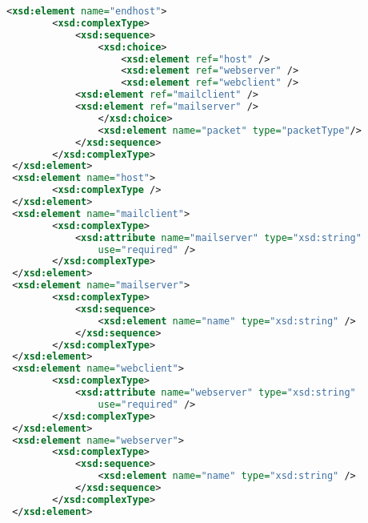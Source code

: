 \begin{lstlisting}[language=XML, caption=Proposal for a generalized endhost data representation]
<xsd:element name="endhost">
        <xsd:complexType>
        	<xsd:sequence>
                <xsd:choice>
	            	<xsd:element ref="host" />
	            	<xsd:element ref="webserver" />
	            	<xsd:element ref="webclient" />
			<xsd:element ref="mailclient" />
			<xsd:element ref="mailserver" />
	            </xsd:choice>
	            <xsd:element name="packet" type="packetType"/>
            </xsd:sequence>
        </xsd:complexType>
 </xsd:element>
 <xsd:element name="host">
        <xsd:complexType />
 </xsd:element>
 <xsd:element name="mailclient">
        <xsd:complexType>
            <xsd:attribute name="mailserver" type="xsd:string"
                use="required" />
        </xsd:complexType>
 </xsd:element>
 <xsd:element name="mailserver">
        <xsd:complexType>
            <xsd:sequence>
                <xsd:element name="name" type="xsd:string" />
            </xsd:sequence>
        </xsd:complexType>
 </xsd:element>
 <xsd:element name="webclient">
        <xsd:complexType>
            <xsd:attribute name="webserver" type="xsd:string"
                use="required" />
        </xsd:complexType>
 </xsd:element>
 <xsd:element name="webserver">
        <xsd:complexType>
            <xsd:sequence>
                <xsd:element name="name" type="xsd:string" />
            </xsd:sequence>
        </xsd:complexType>
 </xsd:element>
\end{lstlisting}